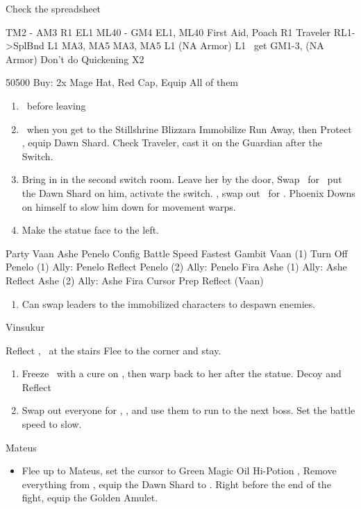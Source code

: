 \begin{liscense}
Check the spreadsheet

				TM2 - AM3	
				R1	EL1
					ML40 - GM4
					EL1, ML40
First Aid, Poach					R1
Traveler					
RL1->SplBnd					
L1					MA3, MA5
				MA3, MA5	L1
			(NA Armor)	L1	
\balthier\ get GM1-3, (NA Armor)
Don't do Quickening X2	
\end{liscense}
\begin{shop}{50500}
Buy: 2x Mage Hat, Red Cap, Equip All of them
\end{shop}
\begin{enumerate}
\item \save\ before leaving
\item \save\ when you get to the Stillshrine
\ashef Blizzara \penelo
\penelof Immobilize \penelo
\vaanf Run Away, then Protect \vaan, equip Dawn Shard. Check Traveler, cast it on the Guardian after the Switch.
\item Bring in \penelo in the second switch room. Leave her by the door, Swap \vaan\ for \balthier\, put the Dawn Shard on him, activate the switch. \leader{\penelo}, swap out \penelo\ for \vaan.
\balthierf Phoenix Downs on himself to slow him down for movement warps.
\item Make the statue face to the left.
\end{enumerate}

\begin{gambit}
Party	Vaan	Ashe	Penelo		
Config	Battle Speed	Fastest			
Gambit	Vaan (1)	Turn Off			
	Penelo (1)	Ally: Penelo			Reflect
	Penelo (2)	Ally: Penelo			Fira
	Ashe (1)	Ally: Ashe			Reflect
	Ashe (2)	Ally: Ashe			Fira
Cursor	Prep Reflect (Vaan)				
\end{gambit}
\begin{enumerate}
\item Can swap leaders to the immobilized characters to despawn enemies.
\end{enumerate}
\begin{battle}{Vinsukur}
\begin{itemize}
\vaanf Reflect \ashe, \penelo\ at the stairs
\vaan Flee to the corner and stay.
\end{itemize}
\end{battle}
\begin{enumerate}
\item Freeze \penelo\ with a cure on \vaan, then warp back to her after the statue.
\vaan Decoy and Reflect \vaan
\item Swap out everyone for \balthier, \basch, and use them to run to the next boss. Set the battle speed to slow.
\end{enumerate}
\begin{battle}{Mateus}
\begin{itemize}
\item Flee up to Mateus, set the cursor to Green Magic
\penelof Oil \penelo
\vaanf Hi-Potion \vaan, Remove everything from \basch, equip the Dawn Shard to \vaan. Right before the end of the fight, equip the Golden Amulet.
\end{itemize}
\end{battle}